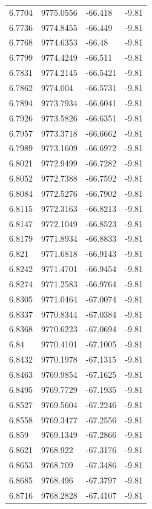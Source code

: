 \begin{table}[H]
\begin{tabular}{llll}
6.7704 & 9775.0556 & -66.418 & -9.81 \\
6.7736 & 9774.8455 & -66.449 & -9.81 \\
6.7768 & 9774.6353 & -66.48 & -9.81 \\
6.7799 & 9774.4249 & -66.511 & -9.81 \\
6.7831 & 9774.2145 & -66.5421 & -9.81 \\
6.7862 & 9774.004 & -66.5731 & -9.81 \\
6.7894 & 9773.7934 & -66.6041 & -9.81 \\
6.7926 & 9773.5826 & -66.6351 & -9.81 \\
6.7957 & 9773.3718 & -66.6662 & -9.81 \\
6.7989 & 9773.1609 & -66.6972 & -9.81 \\
6.8021 & 9772.9499 & -66.7282 & -9.81 \\
6.8052 & 9772.7388 & -66.7592 & -9.81 \\
6.8084 & 9772.5276 & -66.7902 & -9.81 \\
6.8115 & 9772.3163 & -66.8213 & -9.81 \\
6.8147 & 9772.1049 & -66.8523 & -9.81 \\
6.8179 & 9771.8934 & -66.8833 & -9.81 \\
6.821 & 9771.6818 & -66.9143 & -9.81 \\
6.8242 & 9771.4701 & -66.9454 & -9.81 \\
6.8274 & 9771.2583 & -66.9764 & -9.81 \\
6.8305 & 9771.0464 & -67.0074 & -9.81 \\
6.8337 & 9770.8344 & -67.0384 & -9.81 \\
6.8368 & 9770.6223 & -67.0694 & -9.81 \\
6.84 & 9770.4101 & -67.1005 & -9.81 \\
6.8432 & 9770.1978 & -67.1315 & -9.81 \\
6.8463 & 9769.9854 & -67.1625 & -9.81 \\
6.8495 & 9769.7729 & -67.1935 & -9.81 \\
6.8527 & 9769.5604 & -67.2246 & -9.81 \\
6.8558 & 9769.3477 & -67.2556 & -9.81 \\
6.859 & 9769.1349 & -67.2866 & -9.81 \\
6.8621 & 9768.922 & -67.3176 & -9.81 \\
6.8653 & 9768.709 & -67.3486 & -9.81 \\
6.8685 & 9768.496 & -67.3797 & -9.81 \\
6.8716 & 9768.2828 & -67.4107 & -9.81 \\

\end{tabular}
\end{table}
